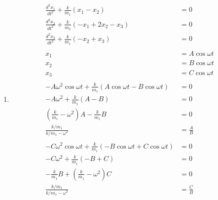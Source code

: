 \documentclass{article}
\begin{document}
\begin{enumerate}
  \item

        \begin{align*}
          \frac{d^2 x_1}{d t^2} + \frac{k}{m_1} (x_1 - x_2)                              & = 0               \\
          \frac{d^2 x_2}{d t^2} + \frac{k}{m_2} (-x_1 + 2 x_2 - x_3)                     & = 0               \\
          \frac{d^2 x_3}{d t^2} + \frac{k}{m_1} (-x_2 + x_3)                             & = 0               \\ \\
          x_1                                                                            & = A \cos \omega t \\
          x_2                                                                            & = B \cos \omega t \\
          x_3                                                                            & = C \cos \omega t \\ \\
          -A \omega^2 \cos \omega t + \frac{k}{m_1} (A \cos \omega t - B \cos \omega t)  & = 0               \\
          -A \omega^2 + \frac{k}{m_1} (A - B)                                            & = 0               \\
          \left( \frac{k}{m_1} - \omega^2 \right) A - \frac{k}{m_1} B                    & = 0               \\
          \frac{k / m_1}{k / m_1 - \omega^2}                                             & = \frac{A}{B}     \\ \\
          -C \omega^2 \cos \omega t + \frac{k}{m_1} (-B \cos \omega t + C \cos \omega t) & = 0               \\
          -C \omega^2 + \frac{k}{m_1} (-B + C)                                           & = 0               \\
          -\frac{k}{m_1} B + \left( \frac{k}{m_1} - \omega^2 \right) C                   & = 0               \\
          \frac{k / m_1}{k / m_1 - \omega^2}                                             & = \frac{C}{B}
        \end{align*}


\end{enumerate}
\end{document}

